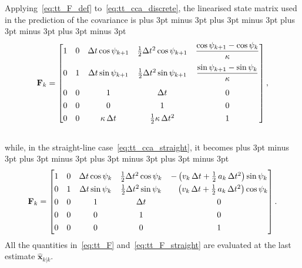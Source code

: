 Applying~\eqref{eq:tt_F_def} to~\eqref{eq:tt_cca_discrete}, the linearised state matrix
used in the prediction of the covariance is
\abovedisplayskip=16pt plus 3pt minus 3pt \belowdisplayskip=16pt plus 3pt minus 3pt
\abovedisplayshortskip=16pt plus 3pt minus 3pt \belowdisplayshortskip=16pt plus 3pt minus 3pt
\begin{equation}
    \renewcommand{\arraystretch}{1.3}\setlength{\jot}{8pt}
    \mathbf{F}_k =
    \begin{bmatrix}
        1 & 0 & \Delta t\cos\psi_{k+1} & \tfrac{1}{2}\Delta t^2\cos\psi_{k+1} & \dfrac{\cos\psi_{k+1} - \cos\psi_k}{\kappa} \\[2ex]
        0 & 1 & \Delta t\sin\psi_{k+1} & \tfrac{1}{2}\Delta t^2\sin\psi_{k+1} & \dfrac{\sin\psi_{k+1} - \sin\psi_k}{\kappa} \\[2ex]
        0 & 0 & 1 & \Delta t & 0 \\
        0 & 0 & 0 & 1 & 0 \\
        0 & 0 & \kappa\,\Delta t & \tfrac{1}{2}\kappa\,\Delta t^2 & 1
    \end{bmatrix},
    \label{eq:tt_F}
\end{equation}
\\while, in the straight-line case~\eqref{eq:tt_cca_straight}, it becomes
\abovedisplayskip=16pt plus 3pt minus 3pt \belowdisplayskip=16pt plus 3pt minus 3pt
\abovedisplayshortskip=16pt plus 3pt minus 3pt \belowdisplayshortskip=16pt plus 3pt minus 3pt
\begin{equation}
    \renewcommand{\arraystretch}{1.3}\setlength{\jot}{8pt}
    \mathbf{F}_k =
    \begin{bmatrix}
        1 & 0 & \Delta t\cos\psi_k & \tfrac{1}{2}\Delta t^2\cos\psi_k & -\left(v_k\,\Delta t + \tfrac{1}{2}\,a_k\,\Delta t^2\right)\sin\psi_k \\
        0 & 1 & \Delta t\sin\psi_k & \tfrac{1}{2}\Delta t^2\sin\psi_k & \phantom{-}\left(v_k\,\Delta t + \tfrac{1}{2}\,a_k\,\Delta t^2\right)\cos\psi_k \\
        0 & 0 & 1 & \Delta t & 0 \\
        0 & 0 & 0 & 1 & 0 \\
        0 & 0 & 0 & 0 & 1
    \end{bmatrix}.
    \label{eq:tt_F_straight}
\end{equation}
All the quantities in~\eqref{eq:tt_F} and~\eqref{eq:tt_F_straight} are evaluated at the
last estimate $\hat{\mathbf{x}}_{k|k}$.

